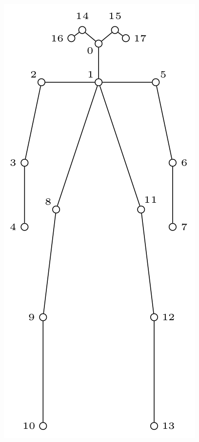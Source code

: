 \documentclass[xcolor=pdftex,dvipsnames,table]{beamer}
\begin{document}
\begin{frame}
\begin{columns}[c]
    \includegraphics[width=\linewidth]{graphics/keypoints}
  \end{columns}
\end{frame}
\end{document}
